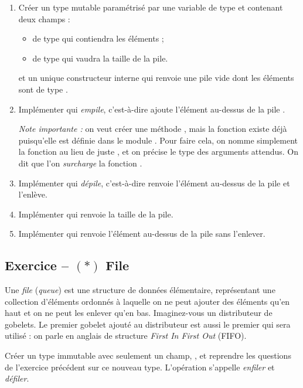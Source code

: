\documentclass{article}
\newcounter{loop}
\newcounter{numEx}
\newcommand{\exo}[1]{
	\stepcounter{numEx}
	\setcounter{loop}{0}
	\subsection*{Exercice \arabic{numEx} -- #1}
}
\begin{document}
\begin{enumerate}
	\item Créer un type mutable  paramétrisé par une variable de type  et contenant deux champs :
	\begin{itemize}
		\item {} de type  qui contiendra les éléments ;
		\item {} de type  qui vaudra la taille de la pile.
	\end{itemize}
	et un unique constructeur interne  qui renvoie une pile vide dont les éléments sont de type .
	\item Implémenter  qui \emph{empile}, c'est-à-dire ajoute l'élément  au-dessus de la pile .

	\emph{Note importante :} on veut créer une méthode , mais la fonction  existe déjà puisqu'elle est définie dans le module . Pour faire cela, on nomme simplement la fonction  au lieu de juste , et on précise le type des arguments attendus. On dit que l'on \emph{surcharge} la fonction .

	\item Implémenter  qui \emph{dépile}, c'est-à-dire renvoie l'élément au-dessus de la pile et l'enlève.

	\item Implémenter  qui renvoie la taille de la pile.

	\item Implémenter  qui renvoie l'élément au-dessus de la pile sans l'enlever.
\end{enumerate}

\exo{$(*)$ File}

Une \emph{file} (\textit{queue}) est une structure de données élémentaire, représentant une collection d'éléments ordonnés à laquelle on ne peut ajouter des éléments qu'en haut et on ne peut les enlever qu'en bas. Imaginez-vous un distributeur de gobelets. Le premier gobelet ajouté au distributeur est aussi le premier qui sera utilisé : on parle en anglais de structure \textit{First In First Out} (FIFO).

Créer un type immutable  avec seulement un champ, , et reprendre les questions de l'exercice précédent sur ce nouveau type. L'opération  s'appelle \emph{enfiler} et  \emph{défiler}.
\end{document}
